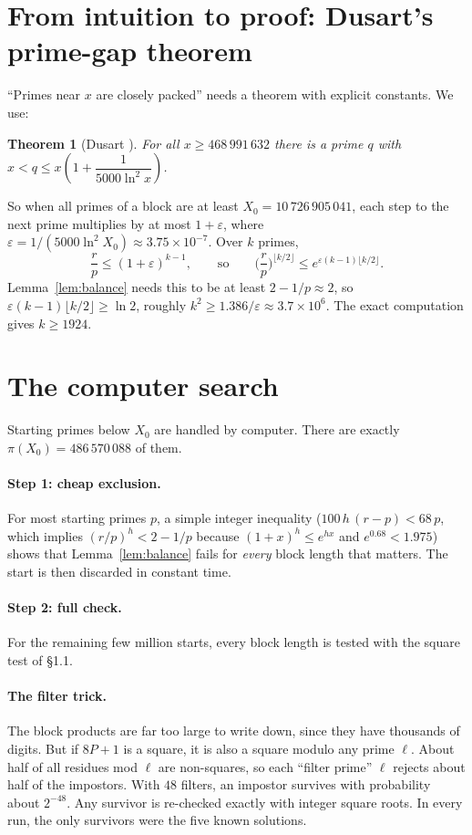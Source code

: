 \documentclass[11pt]{article}
\newtheorem{theorem}{Theorem}
\theoremstyle{definition}
\theoremstyle{remark}
\begin{document}
\section{From intuition to proof: Dusart's prime-gap theorem}

``Primes near $x$ are closely packed'' needs a theorem with explicit constants. We use:

\begin{theorem}[Dusart {\cite[Cor.~5.5]{D18}}]
For all $x \ge 468\,991\,632$ there is a prime $q$ with
$x < q \le x\left(1 + \dfrac{1}{5000 \ln^2 x}\right)$.
\end{theorem}

So when all primes of a block are at least $X_0 = 10\,726\,905\,041$, each step to the next
prime multiplies by at most $1+\varepsilon$, where
$\varepsilon = 1/(5000\ln^2 X_0) \approx 3.75\times 10^{-7}$. Over $k$ primes,
\[
\frac{r}{p} \le (1+\varepsilon)^{k-1}, \qquad\text{so}\qquad
\Big(\frac rp\Big)^{\lfloor k/2\rfloor} \le e^{\varepsilon (k-1)\lfloor k/2\rfloor}.
\]
Lemma~\ref{lem:balance} needs this to be at least $2-1/p \approx 2$, so
$\varepsilon(k-1)\lfloor k/2\rfloor \ge \ln 2$, roughly $k^2 \ge 1.386/\varepsilon \approx 3.7\times10^6$.
The exact computation gives $k \ge 1924$.

\section{The computer search}

Starting primes below $X_0$ are handled by computer. There are exactly
$\pi(X_0) = 486\,570\,088$ of them.

\paragraph{Step 1: cheap exclusion.} For most starting primes $p$, a simple integer
inequality ($100\,h\,(r-p) < 68\,p$, which implies $(r/p)^h < 2-1/p$ because
$(1+x)^h \le e^{hx}$ and $e^{0.68} < 1.975$) shows that Lemma~\ref{lem:balance} fails for
\emph{every} block length that matters. The start is then discarded in constant time.

\paragraph{Step 2: full check.} For the remaining few million starts, every block length is
tested with the square test of \S1.1.

\paragraph{The filter trick.} The block products are far too large to write down, since they
have thousands of digits. But if $8P+1$ is a square, it is also a square modulo any prime
$\ell$. About half of all residues mod $\ell$ are non-squares, so each ``filter prime''
$\ell$ rejects about half of the impostors. With $48$ filters, an impostor survives with
probability about $2^{-48}$. Any survivor is re-checked exactly with integer square roots.
In every run, the only survivors were the five known solutions.
\end{document}
